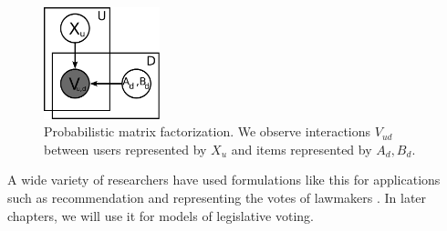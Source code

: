 \begin{figure}
  \begin{center}
  \includegraphics[width=0.3\textwidth]{chapter_introductory_material/figs/irt_gm.pdf}
  \end{center}
  \caption{Probabilistic matrix factorization.  We observe
    interactions $V_{ud}$ between users represented by $X_u$ and items
    represented by $A_d, B_d$.}
  \label{figure:irt_gm}
\end{figure}

A wide variety of researchers have used formulations like this for
applications such as recommendation and representing the votes of
lawmakers \citet{wang:2011,salakhutdinov:2008a,poole:1985,poole:1991,clinton:2004}. In later chapters, we will use it for models of legislative voting.


